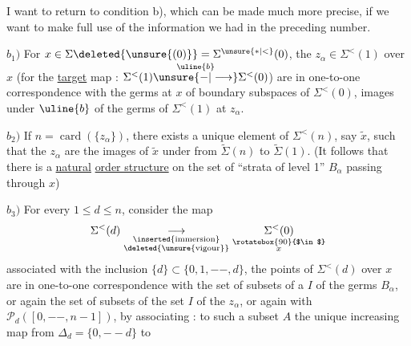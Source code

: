 I want to return to condition b), which can be made much more precise, if we want to make full use of the information we had in the preceding number.

$b_1)$ For $x\in\Sigma\deleted{\unsure{(0)}}=\Sigma^{\unsure{*|<}}(0)$, the $z_\alpha\in\Sigma^{<}(1)$ over $x$ (for the \uline{target} map : $\Sigma^{<}(1)\overset{\uline{b}}{\unsure{-|\longrightarrow}}\Sigma^{<}(0)$) are in one-to-one correspondence with the germs  at $x$ of boundary subspaces of $\Sigma^{<}(0)$,  images under $\uline{b}$ of the germs of $\Sigma^{<}(1)$ at  $z_\alpha$.

$b_2)$  If $n=\operatorname{card}(\{z_\alpha\})$, there exists a unique element  of $\Sigma^{<}(n)$, say $\widetilde{x}$, such that the  $z_\alpha$ are the images of $\widetilde{x}$ under  from $\widetilde\Sigma(n)$ to $\widetilde\Sigma(1)$.
(It follows that there is a \uline{natural}  \uline{order structure} on the set of ``strata of level 1'' $B_\alpha$  passing through $x$)

 $b_3)$ For every  $1\leq d\leq n$, consider the map
\[
\Sigma^{<}(d)\underset{\substack{\inserted{\text{immersion}}\\\deleted{\unsure{\text{vigour}}}}}{\longrightarrow}\underset{\substack{\rotatebox{90}{$\in$}\\x}}{\Sigma^{<}(0)}
\]
associated with the inclusion  $\{d\}\subset\{0,1,--,d\}$, the points  of $\Sigma^{<}(d)$ over $x$ are in one-to-one correspondence with the set of subsets  of a \deleted{$\unsure{\Sigma}$} $I$ of the germs $B_\alpha$, or again the set of subsets  of the set $I$ of the $z_\alpha$, or again with $\mathcal P_d([0,--,n-1])$, by associating : to such a subset $A$ the unique  increasing map from $\Delta_d=\{0,--d\}$ to

